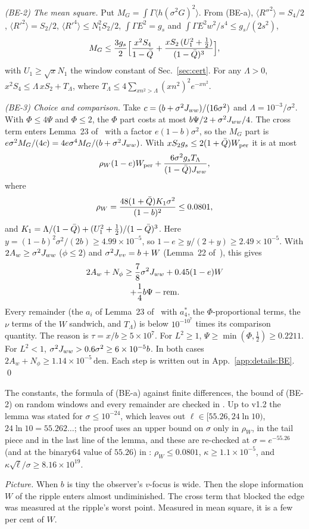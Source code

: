 \emph{(BE-2) The mean square.}
Put $M_G=\int\Gamma\langle h(\sigma^2G)^2\rangle$.
From (BE-a), $\langle R''^2\rangle=S_4/2$, $\langle R'^2\rangle=S_2/2$, $\langle R'^4\rangle\le N_1^2S_2/2$, $\int\Gamma E^2=g_s$ and $\int\Gamma E^2w^2/s^4\le g_s/(2s^2)$,
\begin{equation}
M_G\le\frac{3g_s}{2}\Bigl[\frac{x^2S_4}{1-\bar Q}+\frac{xS_2\,(U_1^2+\frac12)}{(1-\bar Q)^3}\Bigr],
\end{equation}
with $U_1\ge\sqrt xN_1$ the window constant of Sec.~\ref{sec:cert}.
For any $\Lambda>0$, $x^2S_4\le\Lambda\,xS_2+T_\Lambda$, where $T_\Lambda\le4\sum_{xn^2>\Lambda}(xn^2)^2e^{-xn^2}$.

\emph{(BE-3) Choice and comparison.}
Take $c=(b+\sigma^2J_{ww})/(16\sigma^2)$ and $\Lambda=10^{-3}/\sigma^2$.
With $\Phi\le4\Psi$ and $\Phi\le2$, the $\Phi$ part costs at most $b\Psi/2+\sigma^2J_{ww}/4$.
The cross term enters Lemma~23 of~\cite{F} with a factor $e(1-b)\sigma^2$, so the $M_G$ part is $e\sigma^2M_G/(4c)=4e\sigma^4M_G/(b+\sigma^2J_{ww})$.
With $xS_2g_s\le2(1+\bar Q)W_{\rm per}$ it is at most
\begin{equation}
\rho_W(1-e)W_{\rm per}+\frac{6\sigma^2g_sT_\Lambda}{(1-\bar Q)J_{ww}},
\end{equation}
where
\begin{equation}
\rho_W=\frac{48(1+\bar Q)K_1\sigma^2}{(1-b)^2}\le0.0801,
\end{equation}
and $K_1=\Lambda/(1-\bar Q)+(U_1^2+\frac12)/(1-\bar Q)^3$.
Here $y=(1-b)^2\sigma^2/(2b)\ge4.99\times10^{-5}$, so $1-e\ge y/(2+y)\ge2.49\times10^{-5}$.
With $2A_w\ge\sigma^2J_{ww}$ ($\phi\le2$) and $\sigma^2J_{vv}=b+W$ (Lemma~22 of~\cite{F}), this gives
\begin{multline}
2A_w+N_\phi\ge\frac78\sigma^2J_{ww}+0.45(1-e)W\\
+\frac14b\Psi-\mathrm{rem}.
\end{multline}
Every remainder (the $a_i$ of Lemma~23 of~\cite{F} with $a_4^*$, the $\Phi$-proportional terms, the $\nu$ terms of the $W$ sandwich, and $T_\Lambda$) is below $10^{-10^7}$ times its comparison quantity.
The reason is $\tau=x/b\ge5\times10^7$.
For $L^2\ge1$, $\Psi\ge\min(\Phi,\frac12)\ge0.2211$.
For $L^2<1$, $\sigma^2J_{ww}>0.6\sigma^2\ge6\times10^{-5}b$.
In both cases $2A_w+N_\phi\ge1.14\times10^{-5}\,\mathrm{den}$.
Each step is written out in App.~\ref{app:details:BE}.
\qed

The constants, the formula of (BE-a) against finite differences, the bound of (BE-2) on random windows and every remainder are checked in  \numst.
Up to v1.2 the lemma was stated for $\sigma\le10^{-24}$, which leaves out $\ell\in[55.26,24\ln10)$, $24\ln10=55.262\ldots$; the proof uses an upper bound on $\sigma$ only in $\rho_W$, in the tail piece and in the last line of the lemma, and these are re-checked at $\sigma=e^{-55.26}$ (and at the binary64 value of $55.26$) in : $\rho_W\le0.0801$, $\kappa\ge1.1\times10^{-5}$, and $\kappa\sqrt\ell/\sigma\ge8.16\times10^{19}$.

\emph{Picture.} When $b$ is tiny the observer's $v$-focus is wide.
Then the slope information $W$ of the ripple enters almost undiminished.
The cross term that blocked the edge was measured at the ripple's worst point.
Measured in mean square, it is a few per cent of $W$.
